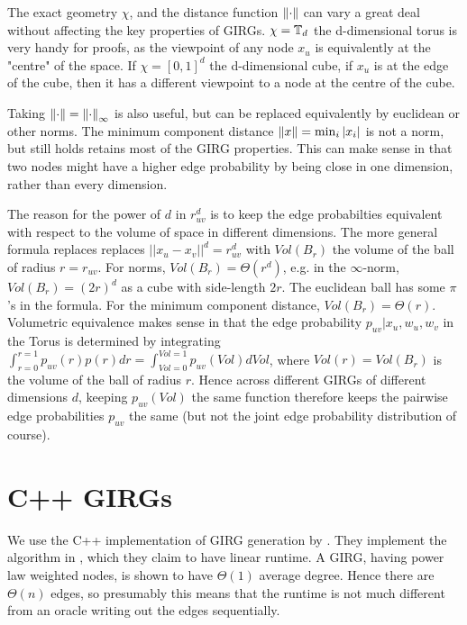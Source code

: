 The exact geometry $\chi$, and the distance function $\left\lVert \cdot\right\rVert$ can vary a great deal without affecting the key properties of GIRGs. $\chi = \mathbb{T}_d$ the d-dimensional torus is very handy for proofs, as the viewpoint of any node $x_u$ is equivalently at the "centre" of the space. If $\chi = [0, 1]^d$ the d-dimensional cube, if $x_u$ is at the edge of the cube, then it has a different viewpoint to a node at the centre of the cube.

Taking $\left\lVert \cdot\right\rVert = \left\lVert \cdot\right\rVert_\infty$ is also useful, but can be replaced equivalently by euclidean or other norms. The minimum component distance $\left\lVert x\right\rVert = \min_i |x_i|$ is not a norm, but still holds retains most of the GIRG properties. This can make sense in that two nodes might have a higher edge probability by being close in one dimension, rather than every dimension.

The reason for the power of $d$ in $r_{uv}^d$ is to keep the edge probabilties equivalent with respect to the volume of space in different dimensions. The more general formula replaces replaces $||x_u - x_v||^d = r_{uv}^d$ with $Vol(B_r)$ the volume of the ball of radius $r=r_{uv}$.
For norms, $Vol(B_r) = \Theta(r^d)$, e.g. in the $\infty$-norm, $Vol(B_r) = (2r)^d$ as a cube with side-length $2r$. The euclidean ball has some $\pi$'s in the formula. For the minimum component distance, $Vol(B_r) = \Theta(r)$. Volumetric equivalence makes sense in that the edge probability $p_{uv} | x_u, w_u, w_v$ in the Torus is determined by integrating $\int_{r=0}^{r=1} p_{uv}(r) p(r) dr = \int_{Vol=0}^{Vol=1} p_{uv}(Vol) dVol$, where $Vol(r) = Vol(B_r)$ is the volume of the ball of radius $r$. Hence across different GIRGs of different dimensions $d$, keeping $p_{uv}(Vol)$ the same function therefore keeps the pairwise edge probabilities $p_{uv}$ the same (but not the joint edge probability distribution of course).




\section{C++ GIRGs}
We use the C++ implementation of GIRG generation by \cite{blasius2022efficiently}.
They implement the algorithm in \cite{bringmann2019geometric}, which they claim to have linear runtime.
A GIRG, having power law weighted nodes, is shown to have $\Theta(1)$ average degree.
Hence there are $\Theta(n)$ edges, so presumably this means that the runtime is not much different from an oracle writing out the edges sequentially.

